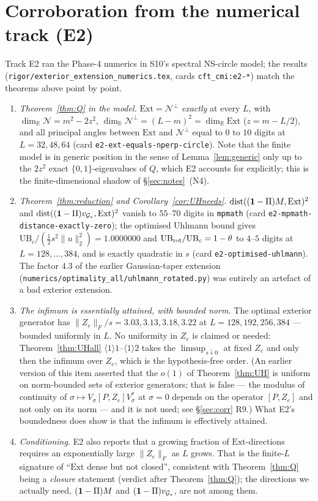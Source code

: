 \documentclass[11pt]{article}
\newcommand{\norm}[1]{\lVert #1\rVert}\newcommand{\abs}[1]{\lvert #1\rvert}
\newcommand{\Ext}{\mathrm{Ext}}\newcommand{\Nvis}{\mathcal N}
\DeclareMathOperator{\dist}{dist}\DeclareMathOperator{\Var}{Var}
\begin{document}
\section{Corroboration from the numerical track (E2)}\label{sec:E2}

Track E2 ran the Phase-4 numerics in S10's spectral NS-circle model; the results
(\texttt{rigor/exterior\_extension\_numerics.tex}, cards \texttt{cft\_cmi:e2-*}) match the
theorems above point by point.
\begin{enumerate}[leftmargin=1.8em,itemsep=2pt]
\item \emph{Theorem~\ref{thm:Q} in the model.}  $\Ext=\Nvis^\perp$ \emph{exactly} at every $L$,
 with $\dim_{\mathbb R}\Nvis=m^2-2z^2$, $\dim_{\mathbb R}\Nvis^\perp=(L-m)^2=\dim_{\mathbb R}\Ext$
 ($z=m-L/2$), and all principal angles between $\Ext$ and $\Nvis^\perp$ equal to $0$ to $10$
 digits at $L=32,48,64$ (card \texttt{e2-ext-equals-nperp-circle}).  Note that the finite model is
 in generic position in the sense of Lemma~\ref{lem:generic} only up to the $2z^2$ exact
 $\{0,1\}$-eigenvalues of $Q$, which E2 accounts for explicitly; this is the finite-dimensional
 shadow of \S\ref{sec:notes}~(N4).
\item \emph{Theorem~\ref{thm:reduction} and Corollary~\ref{cor:UHneeds}.}
 $\dist((\one-\Pi)M,\Ext)^2$ and $\dist((\one-\Pi)v_{\Gs_*},\Ext)^2$ vanish to $55$--$70$ digits
 in \texttt{mpmath} (card \texttt{e2-mpmath-distance-exactly-zero}); the optimised Uhlmann bound
 gives $\mathrm{UB}_c/(\tfrac12s^2\norm u_2^2)=1.0000000$ and
 $\mathrm{UB}_{\rm rot}/\mathrm{UB}_c=1-\theta$ to $4$--$5$ digits at $L=128,\dots,384$, and is
 exactly quadratic in $s$ (card \texttt{e2-optimised-uhlmann}).  The factor $4.3$ of the earlier
 Gaussian-taper extension (\texttt{numerics/optimality\_all/uhlmann\_rotated.py}) was entirely an
 artefact of a bad exterior extension.
\item \emph{The infimum is essentially attained, with bounded norm.}  The optimal exterior
 generator has $\norm{Z_e}_F/s=3.03,3.13,3.18,3.22$ at $L=128,192,256,384$ --- bounded uniformly
 in $L$.  No uniformity in $Z_e$ is claimed or needed: Theorem~\ref{thm:UHall}
 $\langle1\rangle1$--$\langle1\rangle2$ takes the $\limsup_{s\downarrow0}$ at fixed $Z_e$ and only
 then the infimum over $Z_e$, which is the hypothesis-free order.  (An earlier version of this
 item asserted that the $o(1)$ of Theorem~\ref{thm:UH} is uniform on norm-bounded sets of
 exterior generators; that is false --- the modulus of continuity of
 $\sigma\mapsto V_\sigma[P,Z_e]V_\sigma^*$ at $\sigma=0$ depends on the operator $[P,Z_e]$ and not
 only on its norm --- and it is not used; see \S\ref{sec:corr} R9.)  What E2's boundedness does
 show is that the infimum is effectively attained.
\item \emph{Conditioning.}  E2 also reports that a growing fraction of $\Ext$-directions requires
 an exponentially large $\norm{Z_e}_F$ as $L$ grows.  That is the finite-$L$ signature of
 ``$\Ext$ dense but not closed'', consistent with Theorem~\ref{thm:Q} being a \emph{closure}
 statement (verdict after Theorem~\ref{thm:Q}); the directions we actually need,
 $(\mathbf 1-\Pi)M$ and $(\mathbf 1-\Pi)v_{\mathcal G_*}$, are not among them.
\end{enumerate}
\end{document}
